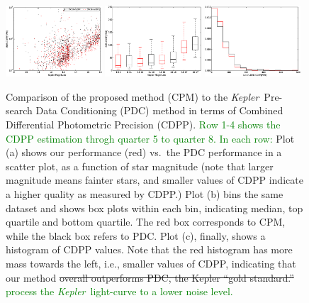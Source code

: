 \documentclass[12pt, preprint]{aastex}
\newcommand{\project}[1]{\textsl{#1}}
\newcommand{\Kepler}{\project{Kepler}}
\newcommand{\name}{CPM}
\newcommand{\revise}[1]{\textcolor{green}{#1}}
\newcommand{\remove}[1]{\sout{#1}}
\begin{document}
\begin{figure}[p]
\begin{center}
\includegraphics[width=0.32\textwidth]{f6j}
\includegraphics[width=0.32\textwidth]{f6k}
\includegraphics[width=0.32\textwidth]{f6l}
\end{center}
\caption{
  \label{cdpp} 
  Comparison of the proposed method (\name) to the \Kepler\ Pre-search Data Conditioning (PDC) method 
    in terms of Combined Differential Photometric Precision (CDPP).
  \revise{Row 1-4 shows the CDPP estimation throgh quarter 5 to quarter 8. In each row:} 
  Plot (a) shows our performance (red) vs.\ the PDC performance in a scatter plot, as a function of star magnitude 
    (note that larger magnitude means fainter stars, 
    and smaller values of CDPP indicate a higher quality as measured by CDPP.)
  Plot (b) bins the same dataset and shows box plots within each bin, 
    indicating median, top quartile and bottom quartile. 
  The red box corresponds to \name, while the black box refers to PDC. 
  Plot (c), finally, shows a histogram of CDPP values. 
  Note that the red histogram has more mass towards the left, i.e., smaller values of CDPP, 
    indicating that our method \remove{overall outperforms PDC, the Kepler ``gold standard.'' } \revise{process the \Kepler\ light-curve to a lower noise level.}
}
\end{figure}
\end{document}

